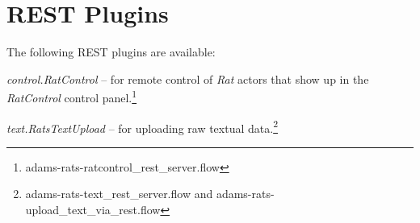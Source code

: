 \documentclass[a4paper]{book}
\begin{document}

\section{REST Plugins}
The following REST plugins are available:
\begin{tight_itemize}
  \item \textit{control.RatControl} -- for remote control of \textit{Rat} actors
  that show up in the \textit{RatControl} control
  panel.\footnote{adams-rats-ratcontrol\_rest\_server.flow}
  \item \textit{text.RatsTextUpload} -- for uploading raw textual
  data.\footnote{adams-rats-text\_rest\_server.flow and adams-rats-upload\_text\_via\_rest.flow}
\end{tight_itemize}


\end{document}
